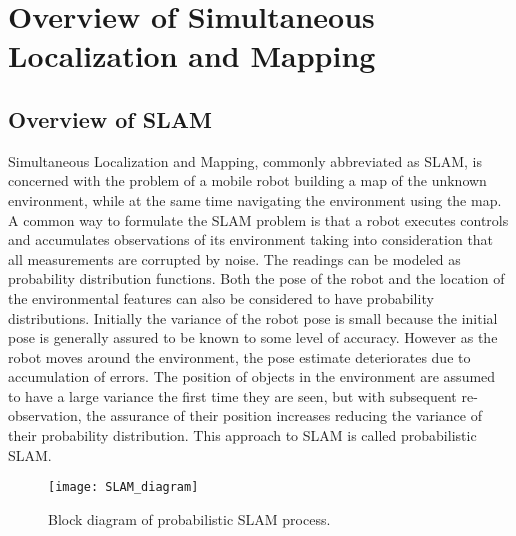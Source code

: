 \chapter{Overview of Simultaneous Localization and Mapping}
\label{cha:Overview}

\section{Overview of SLAM}
\label{sec:SLAM_parts}
Simultaneous Localization and Mapping, commonly abbreviated as SLAM, is concerned with the problem of a mobile robot building a map of the unknown environment, while at the same time navigating the environment using the map. A common way to formulate the SLAM problem is that a robot executes controls and accumulates observations of its environment taking into consideration that all measurements are corrupted by noise. The readings can be modeled as probability distribution functions. Both the pose of the robot and the location of the environmental features can also be considered to have probability distributions. Initially the variance of the robot pose is small because the initial pose is generally assured to be known to some level of accuracy. However as the robot moves around the environment, the pose estimate deteriorates due to accumulation of errors. The position of objects in the environment are assumed to have a large variance the first time they are seen, but with subsequent re-observation, the assurance of their position increases reducing the variance of their probability distribution. This approach to SLAM is called probabilistic SLAM. 

\begin{figure}
\centering
\texttt{[image: SLAM\_diagram]}
\caption{Block diagram of probabilistic SLAM process.}
\label{fig:SLAM_diagram}
\end{figure}

